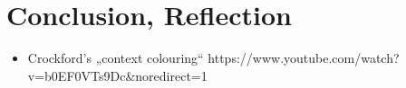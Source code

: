 \chapter{Conclusion, Reflection}\label{conclusion-reflection}

\begin{itemize}
\itemsep1pt\parskip0pt
\item
  Crockford’s „context colouring“
  https://www.youtube.com/watch?v=b0EF0VTs9Dc\&noredirect=1
\end{itemize}
